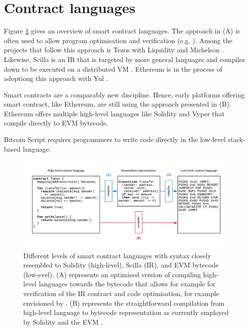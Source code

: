 \section{Contract languages}
\label{languages}

Figure \ref{fig:languagediagram} gives an overview of smart contract languages.
The approach in (A) is often used to allow program optimisation and verification (e.g. \cite{Lattner2004}). 
Among the projects that follow this approach is Tezos with Liquidity \cite{OCamlProSAS2018} and Michelson \cite{DynamicLedgerSolutions2017}. Likewise, Scilla is an IR that is targeted by more general languages and compiles down to be executed on a distributed VM \cite{Sergey2018}.
Ethereum is in the process of adoptiong this approach with Yul \cite{EthereumFoundation2018IULIA}.

Smart contracts are a comparably new discipline.
Hence, early platforms offering smart contract, like Ethereum, are still using the approach presented in (B).
Ethereum offers multiple high-level languages like Solidity \cite{Ethereum2018Solidity} and Vyper \cite{Ethereum2018Vyper} that compile directly to EVM bytecode. 

Bitcoin Script \cite{BitcoinWiki2018Script} requires programmers to write code directly in the low-level stack-based language.


\begin{figure}
\includegraphics[width=\textwidth]{fig/Language.pdf}
\caption{Different levels of smart contract languages with syntax closely resembled to Solidity (high-level), Scilla (IR), and EVM bytecode (low-evel). (A) represents an optimised version of compiling high-level languages towards the bytecode that allows for example for verification of the IR contract and code optimisation, for example envisioned by \cite{Sergey2018,OCamlProSAS2018}. (B) represents the straightforward compilation from high-level language to bytecode representation as currently employed by Solidity and the EVM \cite{Ethereum2018Solidity,Wood2014}.}
\label{fig:languagediagram}
\end{figure}


